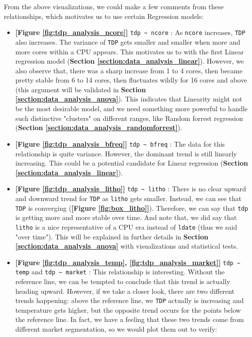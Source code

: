 From the above visualizations, we could make a few comments from these relationships, which motivates us to use certain Regression models:
\begin{itemize}
    \item \textbf{[Figure \ref{fig:tdp_analysis_ncore}]} \verb|tdp ~ ncore| : As \verb|ncore| increases, \verb|TDP| also increases. The variance of \verb|TDP| gets smaller and smaller
    when more and more cores within a CPU appears. This motivates us to with the first Linear regression model (\textbf{Section \ref{section:data_analysis_linear}}).
    However, we also observe that, there was a sharp increase from 1 to 4 cores, then became pretty stable from 6 to 14 cores, then fluctuates wildly for 16 cores
    and above (this argument will be validated in \textbf{Section \ref{section:data_analysis_anova}}). This indicates that Linearity might not be the most desirable
    model, and we need something more powerful to handle such distinctive "clusters" on different ranges, like Random forrest regression
    (\textbf{Section \ref{section:data_analysis_randomforrest}}).
    
    \item \textbf{[Figure \ref{fig:tdp_analysis_bfreq}]} \verb|tdp ~ bfreq| : The data for this relationship is quite variance. However, the dominant trend is still linearly increasing.
    This could be a potential candidate for Linear regression (\textbf{Section \ref{section:data_analysis_linear}}).
    
    \item \textbf{[Figure \ref{fig:tdp_analysis_litho}]} \verb|tdp ~ litho| : There is no clear upward and downward trend for \verb|TDP| as \verb|litho| gets smaller. Instead, we can
    see that \verb|TDP| is converging (\textbf{[Figure \ref{fig:box_litho}]}). Therefore, we can say that \verb|tdp| is getting more and more stable over time.
    And note that, we did say that \verb|litho| is a nice representative of a CPU era instead of \verb|ldate| (thus we said "over time"). This will be explained in further details in 
    \textbf{Section \ref{section:data_analysis_anova}} with visualizations and statistical tests.
    
    \item \textbf{[Figure \ref{fig:tdp_analysis_temp}, \ref{fig:tdp_analysis_market}]} \verb|tdp ~ temp| and \verb|tdp ~ market| : This relationship is interesting. Without the reference line, we can be tempted to conclude that this trend
    is actually heading upward. However, if we take a closer look, there are two different trends happening: above the reference line, we \verb|TDP| actually is increasing and temperature gets higher,
    but the opposite trend occurs for the points below the reference line. In fact, we have a feeling that these two trends come from different market segmentation, so we would plot them out to verify:


\end{itemize}
